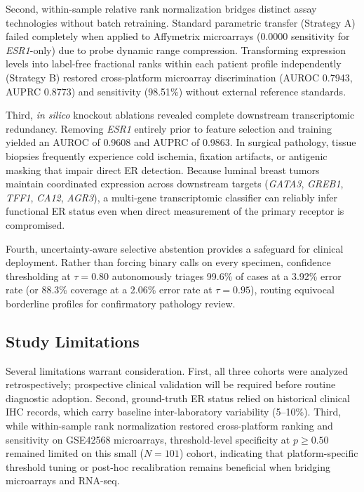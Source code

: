 \documentclass[11pt,a4paper]{article}
\begin{document}
Second, within-sample relative rank normalization bridges distinct assay technologies without batch retraining. Standard parametric transfer (Strategy A) failed completely when applied to Affymetrix microarrays (0.0000 sensitivity for \textit{ESR1}-only) due to probe dynamic range compression. Transforming expression levels into label-free fractional ranks within each patient profile independently (Strategy B) restored cross-platform microarray discrimination (AUROC 0.7943, AUPRC 0.8773) and sensitivity (98.51\%) without external reference standards.

Third, \textit{in silico} knockout ablations revealed complete downstream transcriptomic redundancy. Removing \textit{ESR1} entirely prior to feature selection and training yielded an AUROC of 0.9608 and AUPRC of 0.9863. In surgical pathology, tissue biopsies frequently experience cold ischemia, fixation artifacts, or antigenic masking that impair direct ER detection. Because luminal breast tumors maintain coordinated expression across downstream targets (\textit{GATA3}, \textit{GREB1}, \textit{TFF1}, \textit{CA12}, \textit{AGR3}), a multi-gene transcriptomic classifier can reliably infer functional ER status even when direct measurement of the primary receptor is compromised.

Fourth, uncertainty-aware selective abstention provides a safeguard for clinical deployment. Rather than forcing binary calls on every specimen, confidence thresholding at $\tau = 0.80$ autonomously triages 99.6\% of cases at a 3.92\% error rate (or 88.3\% coverage at a 2.06\% error rate at $\tau = 0.95$), routing equivocal borderline profiles for confirmatory pathology review.

\subsection{Study Limitations}
Several limitations warrant consideration. First, all three cohorts were analyzed retrospectively; prospective clinical validation will be required before routine diagnostic adoption. Second, ground-truth ER status relied on historical clinical IHC records, which carry baseline inter-laboratory variability (5--10\%). Third, while within-sample rank normalization restored cross-platform ranking and sensitivity on GSE42568 microarrays, threshold-level specificity at $p \ge 0.50$ remained limited on this small ($N = 101$) cohort, indicating that platform-specific threshold tuning or post-hoc recalibration remains beneficial when bridging microarrays and RNA-seq.
\end{document}
